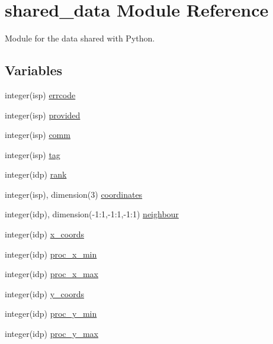 \hypertarget{namespaceshared__data}{}\section{shared\+\_\+data Module Reference}
\label{namespaceshared__data}


Module for the data shared with Python.  


\subsection*{Variables}
\begin{DoxyCompactItemize}
\item 
integer(isp) \hyperlink{namespaceshared__data_abaa407d5754648a7f9982743e6f66cea}{errcode}
\item 
integer(isp) \hyperlink{namespaceshared__data_a8d2ebafd1706311a79669ec57417490c}{provided}
\item 
integer(isp) \hyperlink{namespaceshared__data_a7487068a99e504a127a343402734b57b}{comm}
\item 
integer(isp) \hyperlink{namespaceshared__data_a7877a929286571631efc41c30444e7cd}{tag}
\item 
integer(idp) \hyperlink{namespaceshared__data_a7e8de99f54b7f7fcc513be2975546b9e}{rank}
\item 
integer(isp), dimension(3) \hyperlink{namespaceshared__data_afafd7a6c030e4a324d60bdaf80cdf1fc}{coordinates}
\item 
integer(idp), dimension(-\/1\+:1,-\/1\+:1,-\/1\+:1) \hyperlink{namespaceshared__data_a9b751058861424f3b06e476705e37f2a}{neighbour}
\item 
integer(idp) \hyperlink{namespaceshared__data_ad2930b2e73ee090643c12e9cb17176ec}{x\+\_\+coords}
\item 
integer(idp) \hyperlink{namespaceshared__data_a947fbeedc2c4451e5d740f523ec69a1c}{proc\+\_\+x\+\_\+min}
\item 
integer(idp) \hyperlink{namespaceshared__data_adb07cb664ff097546be35d850bf4768a}{proc\+\_\+x\+\_\+max}
\item 
integer(idp) \hyperlink{namespaceshared__data_a89070910fe26fb1d33016351a3a1fd03}{y\+\_\+coords}
\item 
integer(idp) \hyperlink{namespaceshared__data_a5d06df53dc214205e963f155e25e7192}{proc\+\_\+y\+\_\+min}
\item 
integer(idp) \hyperlink{namespaceshared__data_aba8da0c99ab004ea8cbb5a5da24178fb}{proc\+\_\+y\+\_\+max}
\item 

\end{DoxyCompactItemize}
